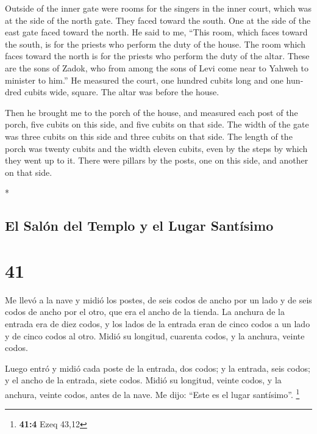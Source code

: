 \begin{paracol}{2}
\begin{otherlanguage}{english}
 Outside of the inner gate were rooms for the singers in
the inner court, which was at the side of the north gate. They faced
toward the south. One at the side of the east gate faced toward the
north.  He said to me, ``This room, which faces toward
the south, is for the priests who perform the duty of the house.
 The room which faces toward the north is for the priests
who perform the duty of the altar. These are the sons of Zadok, who from
among the sons of Levi come near to Yahweh to minister to him.''
 He measured the court, one hundred cubits long and one
hundred cubits wide, square. The altar was before the house.

 Then he brought me to the porch of the house, and
measured each post of the porch, five cubits on this side, and five
cubits on that side. The width of the gate was three cubits on this side
and three cubits on that side.  The length of the porch
was twenty cubits and the width eleven cubits, even by the steps by
which they went up to it. There were pillars by the posts, one on this
side, and another on that side.

\end{otherlanguage}

\switchcolumn[0]*

\hypertarget{el-saluxf3n-del-templo-y-el-lugar-santuxedsimo}{%
\subsection{El Salón del Templo y el Lugar
Santísimo}\label{el-saluxf3n-del-templo-y-el-lugar-santuxedsimo}}

\hypertarget{section-80}{%
\section{41}\label{section-80}}

 Me llevó a la nave y midió los postes, de seis codos de
ancho por un lado y de seis codos de ancho por el otro, que era el ancho
de la tienda.  La anchura de la entrada era de diez codos,
y los lados de la entrada eran de cinco codos a un lado y de cinco codos
al otro. Midió su longitud, cuarenta codos, y la anchura, veinte codos.

 Luego entró y midió cada poste de la entrada, dos codos;
y la entrada, seis codos; y el ancho de la entrada, siete codos.
 Midió su longitud, veinte codos, y la anchura, veinte
codos, antes de la nave. Me dijo: ``Este es el lugar santísimo''.
\footnote{\textbf{41:4} Ezeq 43,12}


\end{paracol}
